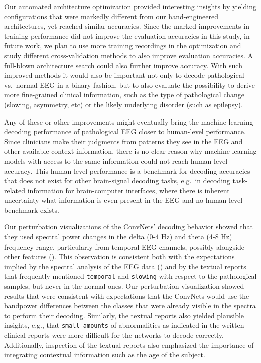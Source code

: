 Our automated architecture optimization provided interesting insights by
yielding configurations that were markedly different from our
hand-engineered architectures, yet reached similar accuracies. Since the
marked improvements in training performance did not improve the
evaluation accuracies in this study, in future work, we plan to use more
training recordings in the optimization and study different
cross-validation methods to also improve evaluation accuracies. A
full-blown architecture search
\cite{mendoza_towards_2016,miikkulainen_evolving_2017,real_large-scale_2017, zoph_neural_2016,zoph_learning_2017}
could also further improve accuracy. With such improved methods it would
also be important not only to decode pathological vs.~normal EEG in a
binary fashion, but to also evaluate the possibility to derive more
fine-grained clinical information, such as the type of pathological
change (slowing, asymmetry, etc) or the likely underlying disorder (such
as epilepsy).

Any of these or other improvements might eventually bring the
machine-learning decoding performance of pathological EEG closer to
human-level performance. Since clinicians make their judgments from
patterns they see in the EEG and other available context information,
there is no clear reason why machine learning models with access to the
same information could not reach human-level accuracy. This human-level
performance is a benchmark for decoding accuracies that does not exist
for other brain-signal decoding tasks, e.g.~in decoding task-related
information for brain-computer interfaces, where there is inherent
uncertainty what information is even present in the EEG and no
human-level benchmark exists.

Our perturbation visualizations of the ConvNets' decoding behavior
showed that they used spectral power changes in the delta (0-4 Hz) and
theta (4-8 Hz) frequency range, particularly from temporal EEG channels,
possibly alongside other features
(). This
observation is consistent both with the expectations implied by the
spectral analysis of the EEG data
() and by the textual reports
that frequently mentioned \texttt{temporal} and \texttt{slowing} with
respect to the pathological samples, but never in the normal ones. Our
perturbation visualization showed results that were consistent with
expectations that the ConvNets would use the bandpower differences
between the classes that were already visible in the spectra to perform
their decoding. Similarly, the textual reports also yielded plausible
insights, e.g., that \texttt{small\ amounts} of abnormalities as
indicated in the written clinical reports were more difficult for the
networks to decode correctly. Additionally, inspection of the textual
reports also emphasized the importance of integrating contextual
information such as the age of the subject.


